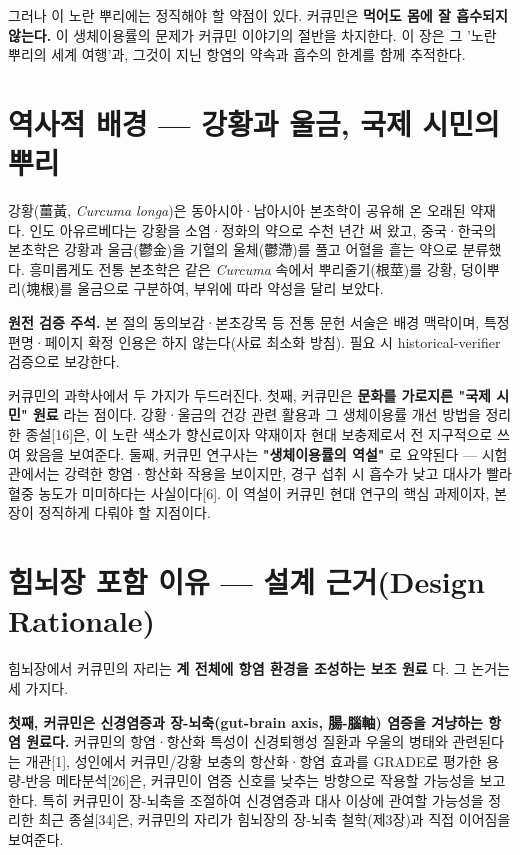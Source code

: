 \documentclass[11pt,oneside]{book}
\newenvironment{authnote}
  {\par\smallskip\begingroup\leftskip=7mm\rightskip=5mm\small\color{muted}\noindent\ignorespaces}
  {\par\endgroup\smallskip}
\begin{document}
그러나 이 노란 뿌리에는 정직해야 할 약점이 있다. 커큐민은 \textbf{먹어도 몸에 잘 흡수되지 않는다.} 이 생체이용률의 문제가 커큐민 이야기의 절반을 차지한다. 이 장은 그 '노란 뿌리의 세계 여행'과, 그것이 지닌 항염의 약속과 흡수의 한계를 함께 추적한다.

\section{역사적 배경 — 강황과 울금, 국제 시민의 뿌리}
강황(薑黃, \textit{Curcuma longa})은 동아시아·남아시아 본초학이 공유해 온 오래된 약재다. 인도 아유르베다는 강황을 소염·정화의 약으로 수천 년간 써 왔고, 중국·한국의 본초학은 강황과 울금(鬱金)을 기혈의 울체(鬱滯)를 풀고 어혈을 흩는 약으로 분류했다. 흥미롭게도 전통 본초학은 같은 \textit{Curcuma} 속에서 뿌리줄기(根莖)를 강황, 덩이뿌리(塊根)를 울금으로 구분하여, 부위에 따라 약성을 달리 보았다.

\begin{authnote}\textbf{원전 검증 주석.} 본 절의 동의보감·본초강목 등 전통 문헌 서술은 배경 맥락이며, 특정 편명·페이지 확정 인용은 하지 않는다(사료 최소화 방침). 필요 시 historical-verifier 검증으로 보강한다.\end{authnote}
커큐민의 과학사에서 두 가지가 두드러진다. 첫째, 커큐민은 \textbf{문화를 가로지른 "국제 시민" 원료} 라는 점이다. 강황·울금의 건강 관련 활용과 그 생체이용률 개선 방법을 정리한 종설[16]은, 이 노란 색소가 향신료이자 약재이자 현대 보충제로서 전 지구적으로 쓰여 왔음을 보여준다. 둘째, 커큐민 연구사는 \textbf{"생체이용률의 역설"} 로 요약된다 — 시험관에서는 강력한 항염·항산화 작용을 보이지만, 경구 섭취 시 흡수가 낮고 대사가 빨라 혈중 농도가 미미하다는 사실이다[6]. 이 역설이 커큐민 현대 연구의 핵심 과제이자, 본 장이 정직하게 다뤄야 할 지점이다.

\section{힘뇌장 포함 이유 — 설계 근거(Design Rationale)}
힘뇌장에서 커큐민의 자리는 \textbf{계 전체에 항염 환경을 조성하는 보조 원료} 다. 그 논거는 세 가지다.

\textbf{첫째, 커큐민은 신경염증과 장-뇌축(gut-brain axis, 腸-腦軸) 염증을 겨냥하는 항염 원료다.} 커큐민의 항염·항산화 특성이 신경퇴행성 질환과 우울의 병태와 관련된다는 개관[1], 성인에서 커큐민/강황 보충의 항산화·항염 효과를 GRADE로 평가한 용량-반응 메타분석[26]은, 커큐민이 염증 신호를 낮추는 방향으로 작용할 가능성을 보고한다. 특히 커큐민이 장-뇌축을 조절하여 신경염증과 대사 이상에 관여할 가능성을 정리한 최근 종설[34]은, 커큐민의 자리가 힘뇌장의 장-뇌축 철학(제3장)과 직접 이어짐을 보여준다.
\end{document}
